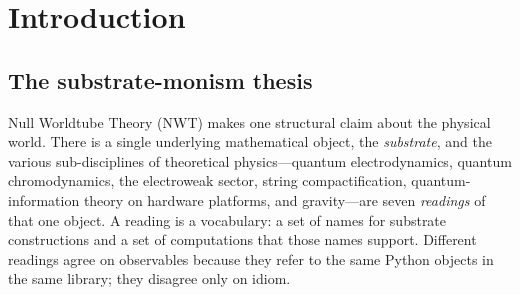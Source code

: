 \documentclass[11pt]{article}
\newcommand{\mPl}{m_{\mathrm{Pl}}}
\newcommand{\me}{m_e}
\begin{document}
\begin{abstract}
We close by displaying the master table: every entry of the
Standard-Model + gravitational column---particle masses, gauge
couplings, $\alpha$, $\sigma$ at the Z pole, $\Gamma_Z$, $G$,
$\me/\mPl$, the Planck--electron mass hierarchy, the Klein--Nishina
amplitude, the muon-decay survival curve on real hardware---is
computed from a small set of substrate primitives within
\texttt{nwt\_substrate}.  We treat substrate monism as a
\emph{computational hypothesis}:\ a commitment that one library,
one set of substrate primitives, and no row-specific tuning
suffice to reproduce the table.  Of the $22$ rows, $5$ are
independent structural predictions, $4$ are direct hardware
measurements, $6$ are textbook QED/QCD identities reproduced from
the substrate algebra, $5$ are inherited from prior NWT papers,
and $2$ are algebraic corollaries; the framework's empirical
exposure rests on the $9$ independent + hardware rows together
with the operational consistency of the remaining $13$.  Whether
this computational unification reflects a single physical
substrate or only a sophisticated common interface is the
program's central interpretive question, to which the present
paper supplies the executable evidence.
\end{abstract}

\tableofcontents

\section{Introduction}

\subsection{The substrate-monism thesis}

Null Worldtube Theory (NWT) makes one structural claim about the
physical world.  There is a single underlying mathematical object,
the \emph{substrate}, and the various sub-disciplines of theoretical
physics---quantum electrodynamics, quantum chromodynamics, the
electroweak sector, string compactification, quantum-information
theory on hardware platforms, and gravity---are seven \emph{readings}
of that one object.  A reading is a vocabulary: a set of names for
substrate constructions and a set of computations that those names
support.  Different readings agree on observables because they refer
to the same Python objects in the same library; they disagree only
on idiom.
\end{document}

